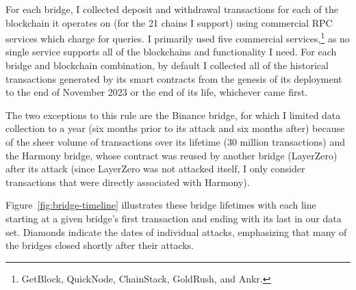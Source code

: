 For each bridge, I collected deposit and withdrawal transactions for
each of the blockchain it operates on (for the 21 chains I
support) using commercial RPC services which charge for queries.  I
primarily used five commercial services,\footnote{%
GetBlock, QuickNode, ChainStack, GoldRush, and Ankr.} 
as no single service supports
all of the blockchains and functionality I need.
For each bridge and blockchain combination, by default I
collected all of the historical transactions generated by its smart
contracts from the genesis of its deployment to the end of November
2023 or the end of its life, whichever came first.

The two exceptions to this rule are the Binance bridge, for which I
limited data collection to a year (six months prior to its attack and
six months after) because of the sheer volume of transactions over its
lifetime (30 million transactions) and the Harmony bridge, whose
contract was reused by another bridge (LayerZero) after its attack
(since LayerZero was not attacked itself, I only consider transactions that were directly associated with Harmony).


%
%

Figure~\ref{fig:bridge-timeline} illustrates these bridge lifetimes
with each line starting at a given bridge's first transaction and
ending with its last in our data set.  Diamonds indicate the dates of
individual attacks, emphasizing that many of the bridges closed
shortly after their attacks.

